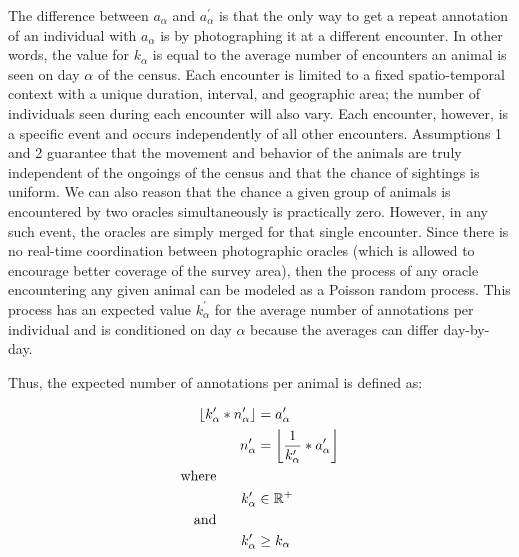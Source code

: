 The difference between $a_{\alpha}$ and $a^{\prime}_{\alpha}$ is that the only way to get a repeat annotation of an individual with $a_{\alpha}$ is by photographing it at a different encounter.  In other words, the value for $k_{\alpha}$ is equal to the average number of encounters an animal is seen on day $\alpha$ of the census.  Each encounter is limited to a fixed spatio-temporal context with a unique duration, interval, and geographic area; the number of individuals seen during each encounter will also vary.  Each encounter, however, is a specific event and occurs independently of all other encounters.  Assumptions 1 and 2 guarantee that the movement and behavior of the animals are truly independent of the ongoings of the census and that the chance of sightings is uniform.  We can also reason that the chance a given group of animals is encountered by two oracles simultaneously is practically zero. However, in any such event, the oracles are simply merged for that single encounter.  Since there is no real-time coordination between photographic oracles (which is allowed to encourage better coverage of the survey area), then the process of any oracle encountering any given animal can be modeled as a Poisson random process.  This process has an expected value $k^{\prime}_{\alpha}$ for the average number of annotations per individual and is conditioned on day $\alpha$ because the averages can differ day-by-day.

\newpage

\noindent Thus, the expected number of annotations per animal is defined as:

\begin{align} \label{eq:lemma}
    \begin{split}
        \left\lfloor k^{\prime}_{\alpha} * n^{\prime}_{\alpha} \right\rfloor  &= a^{\prime}_{\alpha} \\
        n^{\prime}_{\alpha} &= \left\lfloor \frac{1}{k^{\prime}_{\alpha}} * a^{\prime}_{\alpha} \right\rfloor \\
        \text{where} \hspace{1cm} & \\
        k^{\prime}_{\alpha} &\in \mathbb{R}^{+} \\
        \text{and} \hspace{1cm} & \\
        k^{\prime}_{\alpha} &\geq k_{\alpha}
    \end{split}
\end{align}

